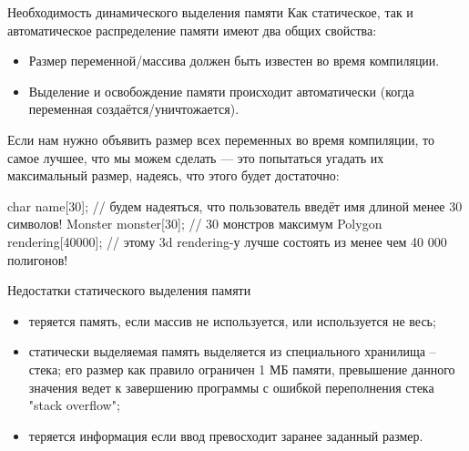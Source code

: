 \documentclass[
    9pt,
    hyperref={pdfencoding=unicode}
    ]{beamer}
\theoremstyle{definition}
\begin{document}
\begin{frame}[fragile]{Необходимость динамического выделения памяти}
    Как статическое, так и автоматическое распределение памяти имеют два общих свойства:
    
    \begin{itemize}
        \item Размер переменной/массива должен быть известен во время компиляции.        
        \item Выделение и освобождение памяти происходит автоматически (когда переменная создаётся/уничтожается).
    \end{itemize}
        
    Если нам нужно объявить размер всех переменных во время компиляции, то самое лучшее, что мы можем сделать — это попытаться угадать их максимальный размер, надеясь, что этого будет достаточно:
    \begin{cppcode}
        char name[30]; // будем надеяться, что пользователь введёт имя длиной менее 30 символов!
        Monster monster[30]; // 30 монстров максимум
        Polygon rendering[40000]; // этому 3d rendering-у лучше состоять из менее чем 40 000 полигонов!
    \end{cppcode}
\end{frame}

\begin{frame}[fragile]{Недостатки статического выделения памяти}
    
    \begin{itemize}
        \item теряется память, если массив не используется, или используется не весь;       
        \item статически выделяемая память выделяется из специального хранилища -- \alert{стека}; его размер как правило ограничен 1 МБ памяти, превышение данного значения ведет к завершению программы с ошибкой переполнения стека "stack overflow";
        \item теряется информация если ввод превосходит заранее заданный размер.
    \end{itemize}    
\end{frame}
\end{document}
